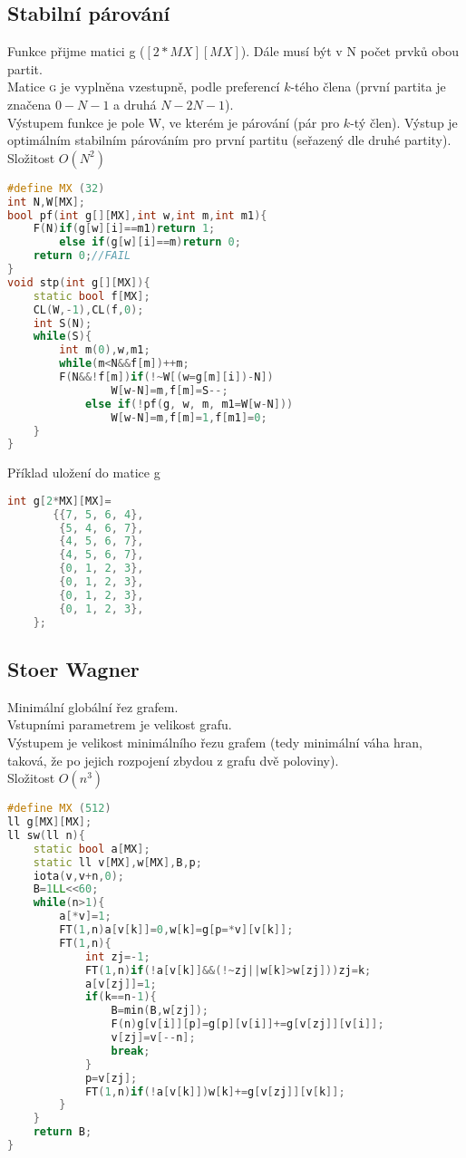 \documentclass[11pt]{article}
\begin{document}
\subsection{Stabilní párování}
Funkce přijme matici \textsf{g} ($[2*MX][MX]$). Dále musí být v \textsf{N} počet prvků obou partit.
\\Matice \textsc{g} je vyplněna vzestupně, podle preferencí $k$-tého člena (první partita je značena $0-N-1$ a druhá $N-2N-1$).
\\Výstupem funkce je pole \textsf{W}, ve kterém je párování (pár pro $k$-tý člen). Výstup je optimálním stabilním párováním pro první partitu (seřazený dle druhé partity).
\\Složitost $O(N^2)$
\begin{lstlisting}[language=C++]
#define MX (32)
int N,W[MX];
bool pf(int g[][MX],int w,int m,int m1){
    F(N)if(g[w][i]==m1)return 1;
        else if(g[w][i]==m)return 0;
    return 0;//FAIL
}
void stp(int g[][MX]){
    static bool f[MX];
    CL(W,-1),CL(f,0);
    int S(N);
    while(S){
        int m(0),w,m1;
        while(m<N&&f[m])++m;
        F(N&&!f[m])if(!~W[(w=g[m][i])-N])
                W[w-N]=m,f[m]=S--;
            else if(!pf(g, w, m, m1=W[w-N]))
                W[w-N]=m,f[m]=1,f[m1]=0;
    }
}
\end{lstlisting}
\begin{center}
Příklad uložení do matice \textsf{g}
\end{center}
\begin{lstlisting}[language=C++]
int g[2*MX][MX]=
       {{7, 5, 6, 4},
        {5, 4, 6, 7},
        {4, 5, 6, 7},
        {4, 5, 6, 7},
        {0, 1, 2, 3},
        {0, 1, 2, 3},
        {0, 1, 2, 3},
        {0, 1, 2, 3},
    };
\end{lstlisting}
\subsection{Stoer Wagner}
Minimální globální řez grafem.
\\Vstupními parametrem je velikost grafu.
\\Výstupem je velikost minimálního řezu grafem (tedy minimální váha hran, taková, že po jejich rozpojení zbydou z grafu dvě poloviny).
\\Složitost $O(n^3)$
\begin{lstlisting}[language=C++]
#define MX (512)
ll g[MX][MX];
ll sw(ll n){
    static bool a[MX];
    static ll v[MX],w[MX],B,p;
    iota(v,v+n,0);
    B=1LL<<60;
    while(n>1){
        a[*v]=1;
        FT(1,n)a[v[k]]=0,w[k]=g[p=*v][v[k]];
        FT(1,n){
            int zj=-1;
            FT(1,n)if(!a[v[k]]&&(!~zj||w[k]>w[zj]))zj=k;
            a[v[zj]]=1;
            if(k==n-1){
                B=min(B,w[zj]);
                F(n)g[v[i]][p]=g[p][v[i]]+=g[v[zj]][v[i]];
                v[zj]=v[--n];
                break;
            }
            p=v[zj];
            FT(1,n)if(!a[v[k]])w[k]+=g[v[zj]][v[k]];
        }
    }
    return B;
}	
\end{lstlisting}
\end{document}
